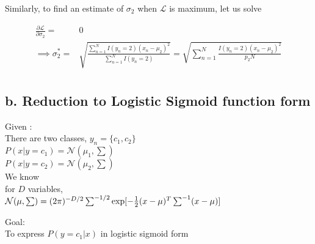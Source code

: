 \documentclass[letterpaper,doc,notimes]{apa6}
\begin{document}
{Similarly, to find an estimate of $\sigma_2$ when $\mathcal{L}$ is maximum, let us solve

\begin{align*}
\frac{\partial \mathcal{L} }{\partial \sigma_2} = &0  \\
\implies \sigma_2^* =& \sqrt{ \frac{ \sum_{n=1}^{N} I(y_n=2) (x_n - \mu_2)^2 }{\sum_{n=1}^{N} I(y_n=2)} } = \sqrt{ \sum_{n=1}^{N} \frac{ I(y_n=2) (x_n - \mu_2)^2 }{p_2 N} } \\
\end{align*}


\subsection{b. Reduction to Logistic Sigmoid function form}
Given :\\
\indent  There are two classes, $y_n = \{c_1, c_2\}$ \\
\indent  $P(x | y= c_1) = \mathcal{N}(\mu_1, \sum)$  \\
\indent  $P(x | y=c_2) = \mathcal{N}(\mu_2, \sum) $ \\

\noindent We know \\
\indent for $D$ variables, \\
\indent \indent $\mathcal{N}(\mu, \sum) = (2\pi)^{-D/2} \sum^{-1/2} \exp[-\frac{1}{2} (x-\mu)^T \space \sum^{-1} \space (x-\mu)]$

\noindent Goal: \\
\indent  To express $P(y=c_1|x) $ in logistic sigmoid form

}
\end{document}
